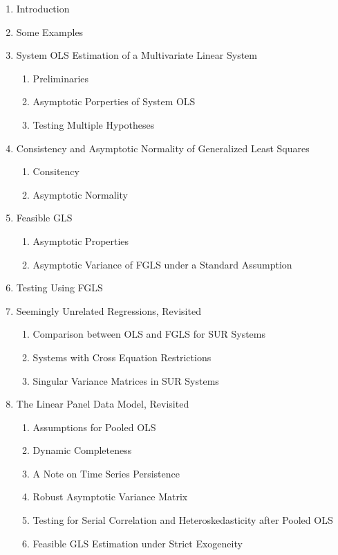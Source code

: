 \documentclass[11pt, oneside, a4paper, article]{article}
\numberwithin{equation}{section}
\begin{document}
\begin{enumerate}[noitemsep, label*=7.\arabic*.]
\item  Introduction
\item  Some Examples

\item  System OLS Estimation of a Multivariate Linear System
\begin{enumerate}[noitemsep, leftmargin=1 em, label*=\arabic*.]
\item Preliminaries
\item Asymptotic Porperties of System OLS
\item Testing Multiple Hypotheses
\end{enumerate}

\item Consistency and Asymptotic Normality of Generalized Least Squares
\begin{enumerate}[noitemsep, leftmargin=1 em, label*=\arabic*.]
\item Consitency
\item Asymptotic Normality
\end{enumerate}

\item Feasible GLS
\begin{enumerate}[noitemsep, leftmargin=1 em, label*=\arabic*.]
\item Asymptotic Properties
\item Asymptotic Variance of FGLS under a Standard Assumption
\end{enumerate}

\item Testing Using FGLS

\item Seemingly Unrelated Regressions, Revisited
\begin{enumerate}[noitemsep, leftmargin=1 em, label*=\arabic*.]
\item Comparison between OLS and FGLS for SUR Systems
\item Systems with Cross Equation Restrictions
\item Singular Variance Matrices in SUR Systems
\end{enumerate}

\item The Linear Panel Data Model, Revisited
\begin{enumerate}[noitemsep, leftmargin=1 em, label*=\arabic*.]
\item Assumptions for Pooled OLS
\item Dynamic Completeness
\item A Note on Time Series Persistence
\item Robust Asymptotic Variance Matrix
\item Testing for Serial Correlation and Heteroskedasticity after Pooled OLS
\item Feasible GLS Estimation under Strict Exogeneity
\end{enumerate}
\end{enumerate}
\end{document}
